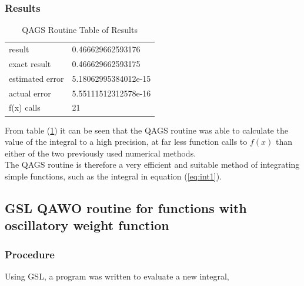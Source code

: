\documentclass[pdf,color]{UoBnote}
\begin{document}
		\subsubsection{Results}
		
		\begin{table}[H]\label{tab:qags-results}
		\centering
		\caption{QAGS Routine Table of Results}
    \begin{tabular}{|l|l|}
    \hline
    result          & 0.466629662593176    \\
    exact result    & 0.466629662593175    \\
    estimated error & 5.18062995384012e-15 \\
    actual error    & 5.55111512312578e-16 \\
    f(x) calls      & 21                   \\
    \hline
    \end{tabular}
\end{table}
			From table (\ref{tab:qags-results}) it can be seen that the QAGS routine was able to calculate the value of the integral to a high precision, at far less function calls to $f(x)$ than either of the two previously used numerical methods.\\
			The QAGS routine is therefore a very efficient and suitable method of integrating simple functions, such as the integral in equation (\ref{eq:int1}).
	\subsection{GSL QAWO routine for functions with oscillatory weight function}
		\subsubsection{Procedure}
			Using GSL, a program was written to evaluate a new integral,
			
\end{document}
